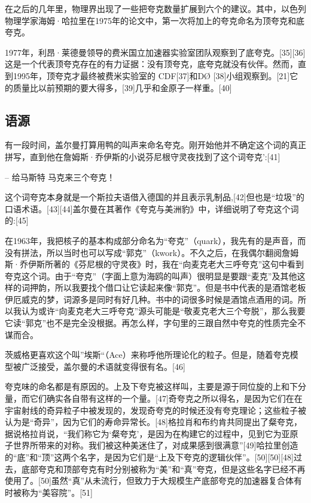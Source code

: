 在之后的几年里，物理界出现了一些把夸克数量扩展到六个的建议。其中，以色列物理学家海姆·哈拉里在1975年的论文中，第一次将加上的夸克命名为顶夸克和底夸克。

1977年，利昂·莱德曼领导的费米国立加速器实验室团队观察到了底夸克。[35][36]这是一个代表顶夸克存在的有力证据：没有顶夸克，底夸克就没有伙伴。然而，直到1995年，顶夸克才最终被费米实验室的 CDF[37]和DØ [38]小组观察到。[21]它的质量比以前预期的要大得多，[39]几乎和金原子一样重。[40]

\subsection{语源}
有一段时间，盖尔曼打算用鸭的叫声来命名夸克。刚开始他并不确定这个词的真正拼写，直到他在詹姆斯·乔伊斯的小说芬尼根守灵夜找到了这个词夸克':[41]

– 给马斯特 马克来三个夸克！

这个词夸克本身就是一个斯拉夫语借入德国的并且表示乳制品,[42]但也是“垃圾”的口语术语。[43][44]盖尔曼在其著作《夸克与美洲豹》中，详细说明了夸克这个词的:[45]

在1963年，我把核子的基本构成部分命名为“夸克”（quark），我先有的是声音，而没有拼法，所以当时也可以写成“郭克”（kwork）。不久之后，在我偶尔翻阅詹姆斯·乔伊斯所著的《芬尼根的守灵夜》时，我在“向麦克老大三呼夸克”这句中看到夸克这个词。由于“夸克”（字面上意为海鸥的叫声）很明显是要跟“麦克”及其他这样的词押韵，所以我要找个借口让它读起来像“郭克”。但是书中代表的是酒馆老板伊厄威克的梦，词源多是同时有好几种。书中的词很多时候是酒馆点酒用的词。所以我认为或许“向麦克老大三呼夸克”源头可能是“敬麦克老大三个夸脱”，那么我要它读“郭克”也不是完全没根据。再怎么样，字句里的三跟自然中夸克的性质完全不谋而合。

茨威格更喜欢这个叫”埃斯“（Ace）来称呼他所理论化的粒子。但是，随着夸克模型被广泛接受，盖尔曼的术语就变得很有名。[46]

夸克味的命名都是有原因的。上及下夸克被这样叫，主要是源于同位旋的上和下分量，而它们确实各自带有这样的一个量。[47]奇夸克之所以得名，是因为它们在在宇宙射线的奇异粒子中被发现的，发现奇夸克的时候还没有夸克理论；这些粒子被认为是“奇异”，因为它们的寿命异常长。[48]格拉肖和布约肯共同提出了粲夸克，据说格拉肖说，“我们称它为‘粲夸克’，是因为在构建它的过程中，见到它为亚原子世界所带来的对称。我们被这种美迷住了，对成果感到很满意”[49]哈拉里创造的“底”和“顶”这两个名字，是因为它们是“上及下夸克的逻辑伙伴”。[50][50][48]过去，底部夸克和顶部夸克有时分别被称为“美”和“真”夸克，但是这些名字已经不再使用了。[50]虽然“真”从未流行，但致力于大规模生产底部夸克的加速器复合体有时被称为“美容院”。[51]

